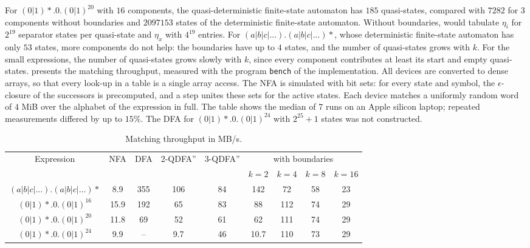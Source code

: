 For $(0|1)*.0.(0|1)^{20}$ with $16$ components, the quasi-deterministic finite-state
automaton has $185$ quasi-states, compared with $7282$ for $3$ components without boundaries
and $2097153$ states of the deterministic finite-state automaton. Without boundaries,
 would tabulate $\eta_i$ for $2^{19}$ separator states
per quasi-state and $\eta_x$ with $4^{19}$ entries. For $(a|b|c|...).(a|b|c|...)*$, whose
deterministic finite-state automaton has only $53$ states, more components do not help: the
boundaries have up to $4$ states, and the number of quasi-states grows with $k$. For the small expressions, the number of quasi-states grows slowly with $k$,
since every component contributes at least its start and empty quasi-states.
\bigbreak
{} presents the matching throughput, measured with the program
\texttt{bench} of the implementation. All devices are converted to dense arrays, so that
every look-up in a table is a single array access. The NFA is simulated with bit sets: for
every state and symbol, the $\epsilon$-closure of the successors is precomputed, and a step
unites these sets for the active states. Each device matches a uniformly random word of
$4$ MiB over the alphabet of the expression in full. The table shows the median of $7$
runs on an Apple silicon laptop; repeated measurements differed by up to $15\%$. The DFA
for $(0|1)*.0.(0|1)^{24}$ with $2^{25} + 1$ states was not constructed.

\begin{table}[ht]
  \centering
  \small
  \setlength{\tabcolsep}{2pt}
  \begin{tabular}{||c c c c c c c c c||}
    \hline
    Expression & NFA & DFA & 2-QDFA'' & 3-QDFA'' & \multicolumn{4}{c||}{with boundaries} \\
    & & & & & $k = 2$ & $k = 4$ & $k = 8$ & $k = 16$ \\ [0.5ex]
    \hline
    $(a|b|c|...).(a|b|c|...)*$ & 8.9 & 355 & 106 & 84 & 142 & 72 & 58 & 23 \\
    \hline
    $(0|1)*.0.(0|1)^{16}$ & 15.9 & 192 & 65 & 83 & 88 & 112 & 74 & 29 \\
    \hline
    $(0|1)*.0.(0|1)^{20}$ & 11.8 & 69 & 52 & 61 & 62 & 111 & 74 & 29 \\
    \hline
    $(0|1)*.0.(0|1)^{24}$ & 9.9 & -- & 9.7 & 46 & 10.7 & 110 & 73 & 29 \\
    \hline
  \end{tabular}
  \caption{Matching throughput in MB/s.}
  \label{tbl:throughput_comparison}
\end{table}

